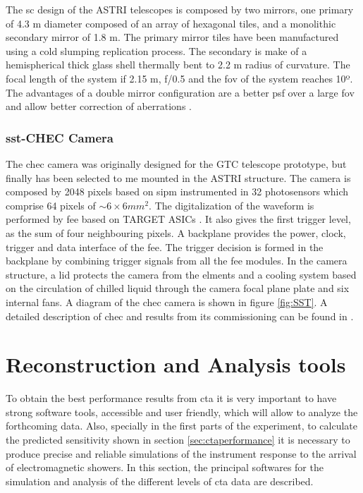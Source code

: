 \documentclass[main.tex]{subfiles}
\begin{document}
The \gls{sc} design of the ASTRI telescopes is composed by two mirrors, one primary of 4.3 m diameter composed of an array of hexagonal tiles, and a monolithic secondary mirror of 1.8 m. The primary mirror tiles have been manufactured using a cold slumping replication process. The secondary is make of a hemispherical thick glass shell thermally bent to 2.2 m radius of curvature. The focal length of the system if 2.15 m, f/0.5 and the \gls{fov} of the system reaches 10º.\\
The advantages of a double mirror configuration are a better \gls{psf} over a large \gls{fov} and allow better correction of aberrations \cite{2017ASTRItels}.

\subsubsection{\gls{sst}-CHEC Camera}

The \gls{chec} camera was originally designed for the GTC telescope prototype, but finally has been selected to me mounted in the ASTRI structure. The camera is composed by 2048 pixels based on \gls{sipm} instrumented in 32 photosensors which comprise 64 pixels of $\sim 6\times6 mm^2$. The digitalization of the waveform is performed by \gls{fee} based on TARGET ASICs \cite{2017TARGETASIC}. It also gives the first trigger level, as the sum of four neighbouring pixels. A backplane provides the power, clock, trigger and data interface of the \gls{fee}. The trigger decision is formed in the backplane by combining trigger signals from all the \gls{fee} modules. In the camera structure, a lid protects the camera from the elments and a cooling system based on the circulation of chilled liquid through the camera focal plane plate and six internal fans. A diagram of the \gls{chec} camera is shown in figure \ref{fig:SST}. A detailed description of \gls{chec} and results from its commissioning can be found in \cite{2017CHECcam}.

\section{Reconstruction and Analysis tools} \label{sec:ctaanalysis}

To obtain the best performance results from \gls{cta} it is very important to have strong software tools, accessible and user friendly, which will allow to analyze the forthcoming data. Also, specially in the first parts of the experiment, to calculate the predicted sensitivity shown in section \ref{sec:ctaperformance} it is necessary to produce precise and reliable simulations of the instrument response to the arrival of electromagnetic showers. In this section, the principal softwares for the simulation and analysis of the different levels of \gls{cta} data are described. 
\end{document}
